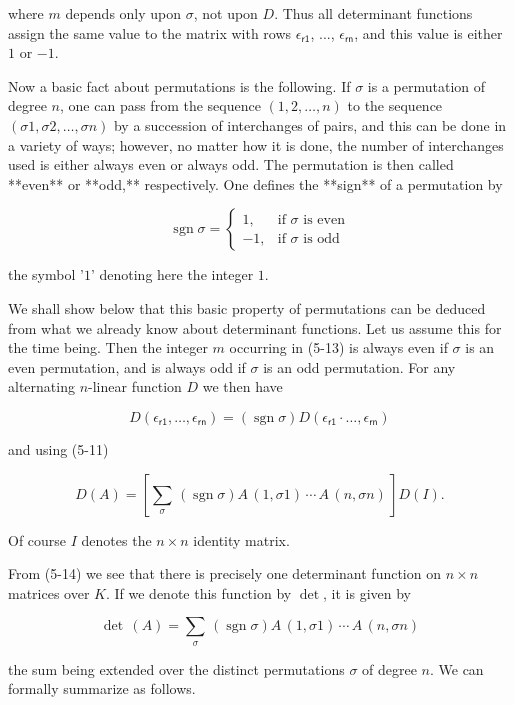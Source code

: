 where \(m\) depends only upon \(\sigma\), not upon \(D\). Thus all determinant functions assign the same value to the matrix with rows \(\epsilon_{\mathsf{r1}}\), ..., \(\epsilon_{\mathsf{rn}}\), and this value is either \(1\) or \(-1\).

Now a basic fact about permutations is the following. If \(\sigma\) is a permutation of degree \(n\), one can pass from the sequence \((1,2,\ldots,n)\) to the sequence \((\sigma 1,\sigma 2,\ldots,\sigma n)\) by a succession of interchanges of pairs, and this can be done in a variety of ways; however, no matter how it is done, the number of interchanges used is either always even or always odd. The permutation is then called **even** or **odd,** respectively. One defines the **sign** of a permutation by

\[\operatorname{sgn}\sigma=\left\{\begin{array}{cl}1,&\text{if $\sigma$ is even}\\ -1,&\text{if $\sigma$ is odd}\end{array}\right.\]

the symbol '\(1\)' denoting here the integer \(1\).

We shall show below that this basic property of permutations can be deduced from what we already know about determinant functions. Let us assume this for the time being. Then the integer \(m\) occurring in (5-13) is always even if \(\sigma\) is an even permutation, and is always odd if \(\sigma\) is an odd permutation. For any alternating \(n\)-linear function \(D\) we then have

\[D(\epsilon_{\mathsf{r1}},\ldots,\epsilon_{\mathsf{rn}})=(\operatorname{sgn} \sigma)D(\epsilon_{\mathsf{r1}}\cdot\ldots,\epsilon_{\mathsf{rn}})\]

and using (5-11)

\[D(A)=\left[\sum_{\sigma}\,(\operatorname{sgn}\sigma)A\,(1,\sigma 1)\,\cdots\,A\,(n,\sigma n)\,\right]D(I).\]

Of course \(I\) denotes the \(n\times n\) identity matrix.

From (5-14) we see that there is precisely one determinant function on \(n\times n\) matrices over \(K\). If we denote this function by \(\det\), it is given by

\[\det\,(A)=\sum_{\sigma}\,(\operatorname{sgn}\sigma)A\,(1,\sigma 1)\,\cdots\,A\,(n,\sigma n)\]

the sum being extended over the distinct permutations \(\sigma\) of degree \(n\). We can formally summarize as follows.

